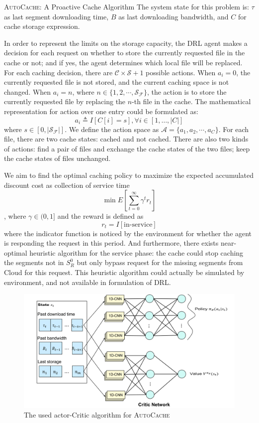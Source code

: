 \documentclass{article}
\begin{document}
\begin{section}{\textsc{AutoCache}: A Proactive Cache Algorithm}
    The system state for this problem is: $\tau$ as last segment downloading time, $B$ as last downloading bandwidth, and $C$ for cache storage expression.

    In order to represent the limits on the storage capacity, the DRL agent makes a decision for each request on whether to store the currently requested file in the cache or not; and if yes, the agent determines which local file will be replaced. For each caching decision, there are $\mathcal{C} \times \mathcal{S} + 1$ possible actions. When $a_i=0$, the currently requested file is not stored, and the current caching space is not changed. When $a_i = n$, where $n\in\{1,2,\cdots,\mathcal{S_F}\}$, the action is to store the currently requested file by replacing the $n$-th file in the cache. The mathematical representation for action over one entry could be formulated as:
    $$
    a_i \triangleq I[C[i]=s], \forall i \in [1, \dots, |C|]
    $$
    where $s \in [0, |\mathcal{S_F}|]$. We define the action space as $\mathcal{A}=\{a_1, a_2, \cdots, a_C\}$. For each file, there are two cache states: cached and not cached. There are also two kinds of actions: find a pair of files and exchange the cache states of the two files; keep the cache states of files unchanged.
    
    We aim to find the optimal caching policy to maximize the expected accumulated discount cost as collection of service time
    $$
    \min E[\sum_{t=0}^{\infty} \gamma^t r_t]
    $$
    , where $\gamma\in(0,1]$ and the reward is defined as
    $$
    r_t = I[\text{in-service}]
    $$
    where the indicator function is noticed by the environment for whether the agent is responding the request in this period. And furthermore, there exists near-optimal heuristic algorithm for the service phase: the cache could stop caching the segments not in $S^{0}_{R}$ but only bypass request for the missing segments from Cloud for this request. This heuristic algorithm could actually be simulated by environment, and not available in formulation of DRL.
    
    \begin{figure}[htp]
        \centering
        \includegraphics[width=0.8\linewidth]{a3c-network.png}
        \caption{The used actor-Critic algorithm for \textsc{AutoCache}}
        \label{fig:a3c}
    \end{figure}
    

\end{section}
\end{document}
